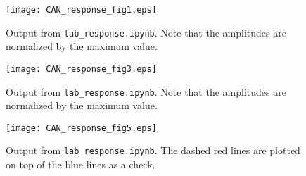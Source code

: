 \documentclass[11pt,titlepage,fleqn]{article}
\newcommand{\tfile}{{\tt lab\_response.ipynb}}
\begin{document}


%

\begin{figure}
\centering
\texttt{[image: CAN\_response\_fig1.eps]}
\caption[]
{{
Output from \tfile.
Note that the amplitudes are normalized by the maximum value.
}}
\label{fig1}
\end{figure}


\begin{figure}
\centering
\texttt{[image: CAN\_response\_fig3.eps]}
\caption[]
{{
Output from \tfile.
Note that the amplitudes are normalized by the maximum value.
}}
\label{fig2}
\end{figure}

\begin{figure}
\centering
\texttt{[image: CAN\_response\_fig5.eps]}
\caption[]
{{
Output from \tfile.
The dashed red lines are plotted on top of the blue lines as a check.
}}
\label{fig3}
\end{figure}

\end{document}

